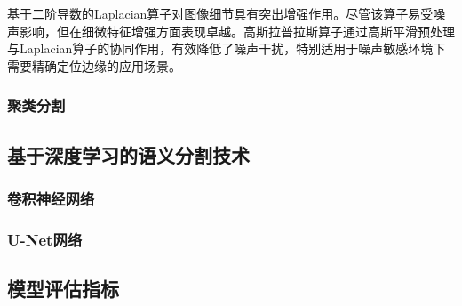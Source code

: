 基于二阶导数的Laplacian算子对图像细节具有突出增强作用。尽管该算子易受噪声影响，但在细微特征增强方面表现卓越。高斯拉普拉斯算子通过高斯平滑预处理与Laplacian算子的协同作用，有效降低了噪声干扰，特别适用于噪声敏感环境下需要精确定位边缘的应用场景。

\subsubsection{聚类分割}

\subsection{基于深度学习的语义分割技术}

\subsubsection{卷积神经网络}

\subsubsection{U-Net网络}


\subsection{模型评估指标}